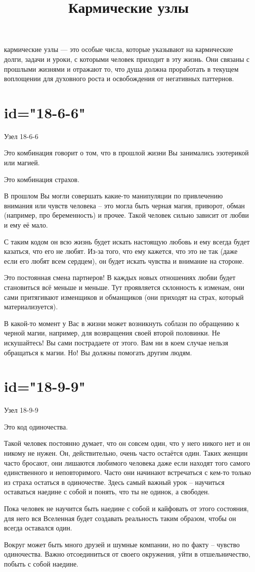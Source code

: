 \title{Кармические узлы}
\description
кармические узлы — это особые числа, которые указывают на 
кармические долги, задачи и уроки, с которыми человек приходит 
в эту жизнь. Они связаны с прошлыми жизнями и отражают то, что 
душа должна проработать в текущем воплощении для духовного роста 
и освобождения от негативных паттернов.
\enddescription

\section{id="18-6-6"}{Узел 18-6-6}
\item Это комбинация говорит о том, что в прошлой жизни Вы 
занимались эзотерикой или магией.
\item Это комбинация страхов.
\item В прошлом Вы могли совершать какие-то манипуляции по 
привлечению внимания или чувств человека – это могла быть 
черная магия, приворот, обман (например, про беременность) 
и прочее. Такой человек сильно зависит от любви и ему её мало.
\item С таким кодом он всю жизнь будет искать настоящую любовь 
и ему всегда будет казаться, что его не любят. Из-за того, 
что ему кажется, что это не так (даже если его любят всем 
сердцем), он будет искать чувства и внимание на стороне.
\item Это постоянная смена партнеров! В каждых новых отношениях 
любви будет становиться всё меньше и меньше. Тут проявляется 
склонность к изменам, они сами притягивают изменщиков и 
обманщиков (они приходят на страх, который материализуется).
\item В какой-то момент у Вас в жизни может возникнуть соблазн 
по обращению к черной магии, например, для возвращения своей 
второй половинки. Не искушайтесь! Вы сами пострадаете от этого. 
Вам ни в коем случае нельзя обращаться к магии. Но! Вы должны 
помогать другим людям.
\endsection

\section{id="18-9-9"}{Узел 18-9-9}
\item Это код одиночества.
\item Такой человек постоянно думает, что он совсем один, что 
у него никого нет и он никому не нужен. Он, действительно, 
очень часто остаётся один. Таких женщин часто бросают, они 
лишаются любимого человека даже если находят того самого 
единственного и неповторимого. Часто они начинают встречаться 
с кем-то только из страха остаться в одиночестве. Здесь самый 
важный урок – научиться оставаться наедине с собой и понять, 
что ты не одинок, а свободен.
\item Пока человек не научится быть наедине с собой и кайфовать 
от этого состояния, для него вся Вселенная будет создавать 
реальность таким образом, чтобы он всегда оставался один.
\item Вокруг может быть много друзей и шумные компании, но по 
факту – чувство одиночества. Важно отсоединиться от своего 
окружения, уйти в отшельничество, побыть с собой наедине.
\endsection

